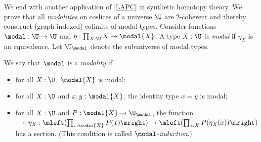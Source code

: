 \documentclass{lmcs}
\theoremstyle{definition}\newtheorem{note}[thm]{Note}
\begin{document}
We end with another application of \autoref{LAPC} in synthetic homotopy theory. We prove that all \emph{modalities} on coslices of a universe $\U$ are $2$-coherent and thereby construct (graph-indexed) colimits of modal types. Consider functions $\modal : \U \to \U$ and $\eta : \prod_{X : \U}X \to \modal{X}$. A type $X : \U$ is \emph{modal} if $\eta_X$ is an equivalence. Let $\U_{\modal}$ denote the subuniverse of modal types.
\begin{defi}
We say that $\modal$ is a \emph{modality} if 
\begin{itemize}
\item for all $X : \U$, $\modal{X}$ is modal;
\item for all $X : \U$ and $x, y : \modal{X}$, the identity type $x = y$ is modal;
\item for all $X : \U$ and $P : \modal{X} \to \U_{\modal}$, the function ${-} \circ \eta_X : \mleft(\prod_{x : \modal{X}}P(x)\mright) \to \mleft(\prod_{x : X}P(\eta_X(x))\mright)$ has a section. (This condition is called \emph{$\modal$-induction}.)
\end{itemize}
\end{defi} 
 
\end{document}
